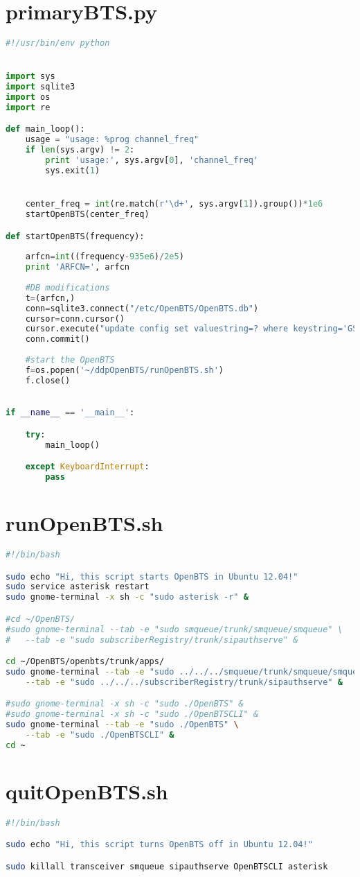 \section{primaryBTS.py}
\begin{lstlisting}[language=Python]
#!/usr/bin/env python


import sys
import sqlite3
import os
import re

def main_loop():
    usage = "usage: %prog channel_freq"
    if len(sys.argv) != 2:
        print 'usage:', sys.argv[0], 'channel_freq'
        sys.exit(1)


    center_freq = int(re.match(r'\d+', sys.argv[1]).group())*1e6
    startOpenBTS(center_freq)

def startOpenBTS(frequency):            
    
    arfcn=int((frequency-935e6)/2e5)
    print 'ARFCN=', arfcn
    
    #DB modifications
    t=(arfcn,)
    conn=sqlite3.connect("/etc/OpenBTS/OpenBTS.db")
    cursor=conn.cursor()
    cursor.execute("update config set valuestring=? where keystring='GSM.Radio.C0'",t)
    conn.commit()
    
    #start the OpenBTS
    f=os.popen('~/ddpOpenBTS/runOpenBTS.sh')
    f.close()
              

if __name__ == '__main__':

    try:
        main_loop()

    except KeyboardInterrupt:
        pass

\end{lstlisting}


\section{runOpenBTS.sh}
\begin{lstlisting}[language=bash]
#!/bin/bash

sudo echo "Hi, this script starts OpenBTS in Ubuntu 12.04!"
sudo service asterisk restart
sudo gnome-terminal -x sh -c "sudo asterisk -r" &

#cd ~/OpenBTS/
#sudo gnome-terminal --tab -e "sudo smqueue/trunk/smqueue/smqueue" \
#   --tab -e "sudo subscriberRegistry/trunk/sipauthserve" &

cd ~/OpenBTS/openbts/trunk/apps/
sudo gnome-terminal --tab -e "sudo ../../../smqueue/trunk/smqueue/smqueue" \
    --tab -e "sudo ../../../subscriberRegistry/trunk/sipauthserve" &

#sudo gnome-terminal -x sh -c "sudo ./OpenBTS" &
#sudo gnome-terminal -x sh -c "sudo ./OpenBTSCLI" &
sudo gnome-terminal --tab -e "sudo ./OpenBTS" \
    --tab -e "sudo ./OpenBTSCLI" &
cd ~

\end{lstlisting}


\section{quitOpenBTS.sh}
\begin{lstlisting}[language=bash]
#!/bin/bash

sudo echo "Hi, this script turns OpenBTS off in Ubuntu 12.04!"

sudo killall transceiver smqueue sipauthserve OpenBTSCLI asterisk
\end{lstlisting}




